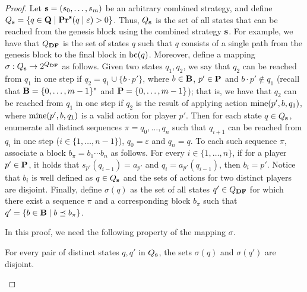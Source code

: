 \begin{proof}
Let $\mathbf{s}= (s_0, \ldots, s_m)$ be an arbitrary combined strategy, and define $Q_{\mathbf{s}} = \{q \in \mathbf{Q} \mid \mathbf{Pr}^{\mathbf{s}}(q \mid \varepsilon) > 0\}$. Thus, $Q_{\mathbf{s}}$ is the set of all states that can be reached from the genesis block using the combined strategy $\mathbf{s}$. For example, we have that $Q_{\text{\rm {\bf DF}}}$ is the set of states $q$ such that $q$ consists of a single path from the genesis block to the final block in $\text{bc}(q)$.
Moreover, define a mapping $\sigma: Q_{\mathbf{s}} \rightarrow 2^{Q_{\text{\rm {\bf DF}}}}$ as follows. Given two states $q_1, q_2$, we say that $q_2$ can be reached from $q_1$ in one step if $q_2 = q_1 \cup \{ b \cdot p' \}$, where $b \in \mathbf{B}$, $p' \in \mathbf{P}$ and $b \cdot p' \not\in q_1$ (recall that $\mathbf{B} = \{0, \ldots, m-1\}^*$ and $\mathbf{P} = \{0, \ldots, m-1\}$); that is, we have that $q_2$ can be reached from $q_1$ in one step  if $q_2$ is the result of applying action $\text{\rm mine}(p', b, q_1)$, where $\text{\rm mine}(p', b, q_1)$ is a valid action for player $p'$. 
Then for each state $q \in Q_{\mathbf{s}}$, enumerate all distinct sequences $\pi = q_0,\dots,q_n$ such that $q_{i+1}$ can be reached from 
$q_i$ in one step ($i \in \{1, \ldots, n-1\}$), $q_0 = \varepsilon$ and $q_n = q$. To each such sequence $\pi$, associate a block $b_\pi = b_1 \cdots b_n$ as follows. 
For every $i \in \{1, \ldots, n\}$, if for a player $p' \in \mathbf{P}$, it holds that $s_{p'}(q_{i-1}) = a_{p'}$ and $q_{i} = a_{p'}(q_{i-1})$, then $b_i = p'$. Notice that $b_i$ is well defined as $q \in Q_{\mathbf{s}}$ and the sets of actions for two distinct players are disjoint.
Finally, define $\sigma(q)$ as the set of all states $q' \in Q_{\text{\rm {\bf DF}}}$ for which there exist a sequence $\pi$ and a corresponding block $b_\pi$ such that $q' = \{ b \in \mathbf{B} \mid b \preceq b_\pi \}$.

In this proof, we need the following property of the mapping $\sigma$.

\begin{myclaim}
\label{claim-nonempty-inter-gen}
For every pair of distinct states $q,q'$ in $Q_{\mathbf{s}}$, the sets $\sigma(q)$ and $\sigma(q')$ are disjoint. 
\end{myclaim}


\end{proof}
